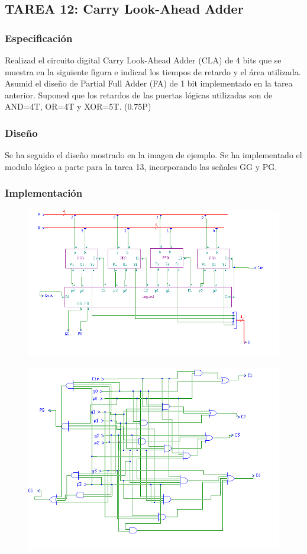 \documentclass{article}
\begin{document}
	\subsection{TAREA 12: Carry Look-Ahead Adder}
		\subsubsection*{Especificación}
		Realizad el circuito digital Carry Look-Ahead Adder (CLA) de 4 bits que se muestra en
la siguiente figura e indicad los tiempos de retardo y el área utilizada. Asumid el diseño de Partial
Full Adder (FA) de 1 bit implementado en la tarea anterior. Suponed que los retardos de las puertas
lógicas utilizadas son de AND=4T, OR=4T y XOR=5T. (0.75P)


		\subsubsection*{Diseño}
		Se ha seguido el diseño mostrado en la imagen de ejemplo. Se ha implementado el modulo lógico a parte para la tarea 13, incorporando las señales GG y PG.
		\subsubsection*{Implementación}
		 \begin{figure}[ht]
		 	\includegraphics[width=0.8\linewidth]{CLA}
		 	\centering
		 \end{figure}
		
		 \begin{figure}[ht]
		 	\includegraphics[width=0.8\linewidth]{CLALogic}
			\centering
		 \end{figure}
\end{document}
